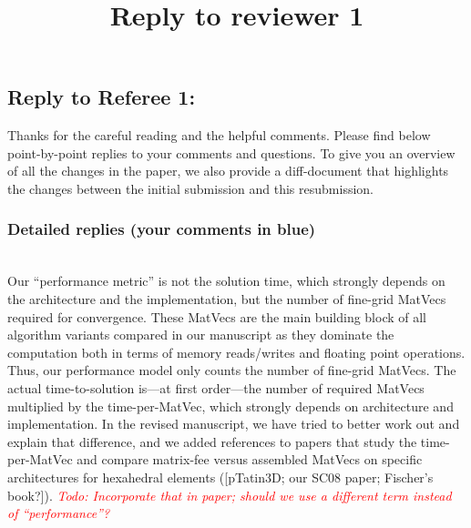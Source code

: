 \documentclass[12pt]{article}
\title{Reply to reviewer 1}
\newcommand{\todo}[1]{\noindent\emph{\textcolor{red}{Todo: #1\:}}}
\newcommand{\referee}[1]{\vspace{3ex}\noindent{\textcolor{blue}{#1}}\\[2ex]}
\begin{document}
\subsection*{Reply to Referee 1:}

Thanks for the careful reading and the helpful comments.
Please find below point-by-point replies to your comments and
questions. To give you an overview of all the changes in the paper, we
also provide a diff-document that highlights the changes between the
initial submission and this resubmission.

\subsubsection*{Detailed replies (your comments in blue)}

\referee{
Summary impression:\\[.2ex]
Given the interest in high-order methods and the notable cost of the
underlying solver for poisson-type problems in addition to the variety
of options, the core thesis of the manuscript is well-placed.  Yet,
the presentation of the numerics does not lead the reader to conclude
anything from the comparison --- ie, there are too many ways to
interpret the convergence based on iterations and the cost of the
methods.  The primary concern as stated in the Contributions section
was to address the "actual performance", but as it stands the results
do not attempt to answer this.  Indeed, actual timings are avoided
(and clearly stated this way), the performance model is not realistic
(also as stated, since it can vary from implementation and
architecture), and the iterations are not combined with the perceived
cost in a clear way.  Again, the targeted contributions of this
manuscript would be quite interesting, but the numerics and discussion
could be significantly improved to support many of the statements.}
\noindent
Our ``performance metric'' is not the solution time, which strongly
depends on the architecture and the implementation, but the number of
fine-grid MatVecs required for convergence. These MatVecs are the main
building block of all algorithm variants compared in our manuscript as
they dominate the computation both in terms of memory reads/writes and
floating point operations. Thus, our performance model only counts the
number of fine-grid MatVecs. The actual time-to-solution is---at first
order---the number of required MatVecs multiplied by the
time-per-MatVec, which strongly depends on architecture and
implementation. In the revised manuscript, we have tried to better
work out and explain that difference, and we added references to
papers that study the time-per-MatVec and compare matrix-fee versus
assembled MatVecs on specific architectures for hexahedral elements
([pTatin3D; our SC08 paper; Fischer's book?]).
\todo{Incorporate that in paper; should we use a different term
  instead of ``performance''?}
\end{document}
